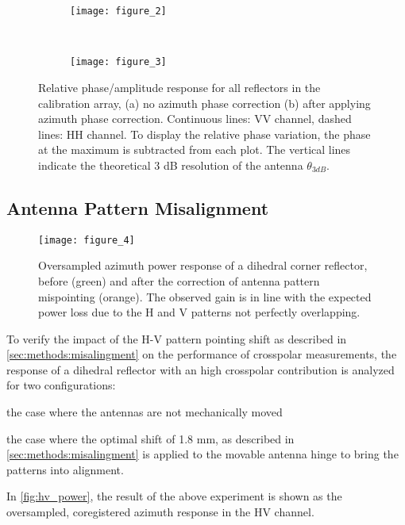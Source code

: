\begin{figure*}[ht]
	\centering
	\begin{subfigure}[t]{\textwidth}
		\centering
		\texttt{[image: figure\_2]}
		\label{fig:phase_response_VV:uncorrected}
	\end{subfigure}\\
	\begin{subfigure}[t]{\textwidth}
		\centering
		\texttt{[image: figure\_3]}
		\label{fig:phase_response_VV:corrected}
	\end{subfigure}
	\caption{Relative phase/amplitude response for all reflectors in the calibration array, (a) no azimuth phase correction (b) after applying azimuth phase correction. Continuous lines: VV channel, dashed lines: HH channel. To display the relative phase variation, the phase at the maximum is subtracted from each plot. The vertical lines indicate the theoretical 3 dB resolution of the antenna $\theta_{3dB}$.}
	\label{fig:phase_response_VV}
\end{figure*}

\subsection{Antenna Pattern Misalignment}\label{sec:results:misalignment}
\begin{figure*}[ht!]
	\centering
	\texttt{[image: figure\_4]}
	\caption{Oversampled azimuth power response of a dihedral corner reflector, before (green) and after the correction of antenna pattern mispointing (orange). The observed gain is in line with the expected power loss due to the H and V patterns not perfectly overlapping.}
	\label{fig:hv_power}
\end{figure*}
To verify the impact of the H-V pattern pointing shift as described in \autoref{sec:methods:misalingment} on the performance of crosspolar measurements, the response of a dihedral reflector with an high crosspolar contribution is analyzed for two configurations:\\ \begin{enumerate*}\item the case where the antennas are not mechanically moved \item the case where the optimal shift of 1.8 mm, as described in \autoref{sec:methods:misalingment} is applied to the movable antenna hinge to bring the patterns into alignment.\\ 
\end{enumerate*}
In \autoref{fig:hv_power}, the result of the above experiment is shown as the oversampled, coregistered azimuth response in the HV channel.
